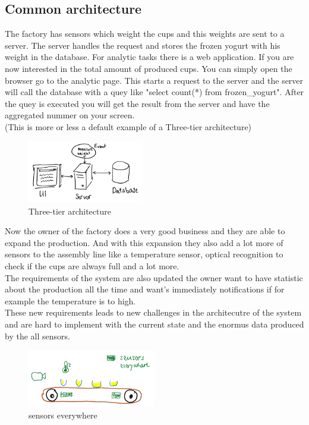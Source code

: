\subsection{Common architecture}
The factory has sensors which weight the cups and this weights are sent to a server.
The server handles the request and stores the frozen yogurt with his weight in the database.
For analytic tasks there is a web application. If you are now interested in the total amount of produced cups.
You can simply open the browser go to the analytic page.
This starts a request to the server and the server will call the database with a quey like "select count(*) from frozen\_yogurt".
After the quey is executed you will get the result from the server and have the aggregated nummer on your screen.\\
(This is more or less a default example of a Three-tier architecture)

\begin{figure}[H]
\centering
\captionsetup{justification=centering}
\includegraphics[width=0.45\textwidth]{images/three_tier.png}
\caption[Three-tier architecture]{Three-tier architecture}
\end{figure}

\newpage

Now the owner of the factory does a very good business and they are able to expand the production.
And with this expansion they also add a lot more of sensors to the assembly line like a temperature sensor,
optical recognition to check if the cups are always full and a lot more.\\
The requirements of the system are also updated the owner want to have statistic about the production all the time
and want's immediately notifications if for example the temperature is to high.\\
These new requirements leads to new challenges in the architecutre of the system and are hard to implement with the
current state and the enormus data produced by the all sensors.

\begin{figure}[H]
\centering
\captionsetup{justification=centering}
\includegraphics[width=0.5\textwidth]{images/sensors.png}
\caption[sensors everywhere]{sensors everywhere}
\end{figure}

